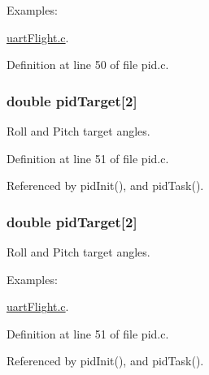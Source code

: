 \begin{Desc}
\item[Examples\-: ]\par
\hyperlink{uart_flight_8c-example}{uart\-Flight.\-c}.\end{Desc}


Definition at line 50 of file pid.\-c.

\hypertarget{group__pid_ga260bc1ef7a231f2252e6e69e1e459ba6}{
\subsubsection[{pid\-Target}]{\setlength{\rightskip}{0pt plus 5cm}double pid\-Target\mbox{[}2\mbox{]}}}\label{group__pid_ga260bc1ef7a231f2252e6e69e1e459ba6}


Roll and Pitch target angles. 



Definition at line 51 of file pid.\-c.



Referenced by pid\-Init(), and pid\-Task().

\hypertarget{group__pid_ga260bc1ef7a231f2252e6e69e1e459ba6}{
\subsubsection[{pid\-Target}]{\setlength{\rightskip}{0pt plus 5cm}double pid\-Target\mbox{[}2\mbox{]}}}\label{group__pid_ga260bc1ef7a231f2252e6e69e1e459ba6}


Roll and Pitch target angles. 

\begin{Desc}
\item[Examples\-: ]\par
\hyperlink{uart_flight_8c-example}{uart\-Flight.\-c}.\end{Desc}


Definition at line 51 of file pid.\-c.



Referenced by pid\-Init(), and pid\-Task().


